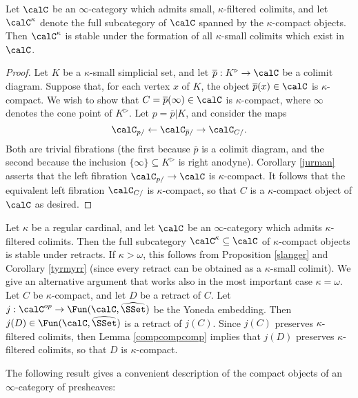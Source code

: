 \begin{corollary}\label{tyrmyrr}
Let $\calC$ be an $\infty$-category which admits small, $\kappa$-filtered colimits, and let
$\calC^{\kappa}$ denote the full subcategory of $\calC$ spanned by the $\kappa$-compact objects. Then $\calC^{\kappa}$ is stable under the formation of all $\kappa$-small colimits which exist in $\calC$.
\end{corollary}

\begin{proof}
Let $K$ be a $\kappa$-small simplicial set, and let $\overline{p}: K^{\triangleright} \rightarrow \calC$ be a colimit diagram. Suppose that, for each vertex $x$ of $K$, the object $\overline{p}(x) \in \calC$ is $\kappa$-compact. We wish to show that $C= \overline{p}(\infty) \in \calC$ is $\kappa$-compact, where $\infty$ denotes the cone point of $K^{\triangleright}$. Let $p = \overline{p}|K$, and consider the maps
$$ \calC_{p/} \leftarrow \calC_{ \overline{p}/ } \rightarrow \calC_{ C/}. $$
Both are trivial fibrations (the first because $\overline{p}$ is a colimit diagram, and the second because the inclusion $\{ \infty\} \subseteq K^{\triangleright}$ is right anodyne). Corollary \ref{jurman} asserts that the left fibration $\calC_{p/} \rightarrow \calC$ is $\kappa$-compact. It follows that the equivalent left fibration $\calC_{C/}$ is $\kappa$-compact, so that $C$ is a $\kappa$-compact object of $\calC$ as desired.
\end{proof}

\begin{remark}\label{trmyr}
Let $\kappa$ be a regular cardinal, and let $\calC$ be an $\infty$-category which admits $\kappa$-filtered colimits. Then the full subcategory $\calC^{\kappa} \subseteq \calC$ of $\kappa$-compact objects is stable under retracts. If $\kappa > \omega$, this follows from 
Proposition \ref{slanger} and Corollary \ref{tyrmyrr} (since every retract can be obtained as a $\kappa$-small colimit). We give an alternative argument that works also in the most important case $\kappa = \omega$. Let $C$ be $\kappa$-compact, and let $D$ be a retract of $C$. Let
$j: \calC^{op} \rightarrow \Fun(\calC, \widehat{\SSet})$ be the Yoneda embedding. Then
$j(D) \in \Fun(\calC, \widehat{\SSet})$ is a retract of $j(C)$. Since $j(C)$ preserves $\kappa$-filtered colimits, then Lemma \ref{compcompcomp} implies that $j(D)$ preserves $\kappa$-filtered colimits, so that $D$ is $\kappa$-compact.
\end{remark}

The following result gives a convenient description of the compact objects of an $\infty$-category of presheaves:

